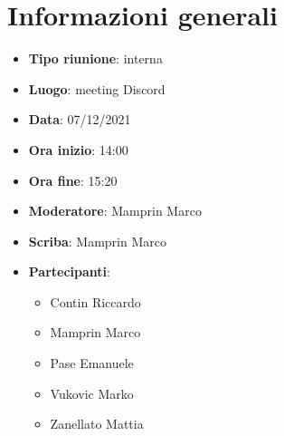 \section{Informazioni generali}
\begin{itemize}
  \item \textbf{Tipo riunione}: interna
  \item \textbf{Luogo}: meeting Discord
  \item \textbf{Data}: 07/12/2021
  \item \textbf{Ora inizio}: 14:00
  \item \textbf{Ora fine}: 15:20
  \item \textbf{Moderatore}: Mamprin Marco
  \item \textbf{Scriba}: Mamprin Marco
  \item \textbf{Partecipanti}:
  \begin{itemize}
    \item Contin Riccardo
    \item Mamprin Marco
    \item Pase Emanuele
    \item Vukovic Marko
    \item Zanellato Mattia
  \end{itemize}
\end{itemize}
